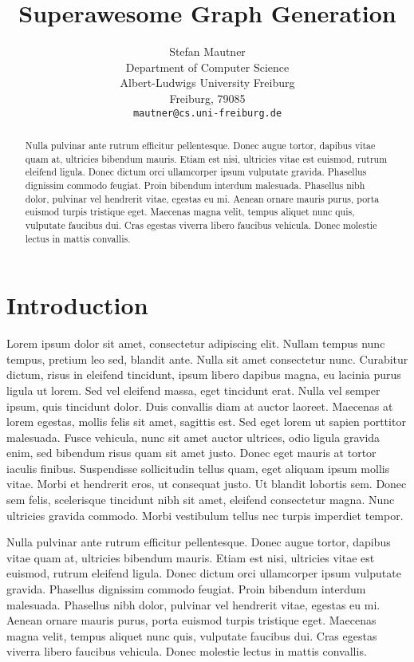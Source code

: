 \documentclass{article}
\title{Superawesome Graph Generation}
\author{
  Stefan Mautner\\
  Department of Computer Science\\
  Albert-Ludwigs University Freiburg\\
  Freiburg, 79085  \\
  \texttt{mautner@cs.uni-freiburg.de} \\
}
\begin{document}

\maketitle

\begin{abstract}
Nulla pulvinar ante rutrum efficitur pellentesque. Donec augue tortor, dapibus vitae quam at, ultricies bibendum mauris. Etiam est nisi, ultricies vitae est euismod, rutrum eleifend ligula. Donec dictum orci ullamcorper ipsum vulputate gravida. Phasellus dignissim commodo feugiat. Proin bibendum interdum malesuada. Phasellus nibh dolor, pulvinar vel hendrerit vitae, egestas eu mi. Aenean ornare mauris purus, porta euismod turpis tristique eget. Maecenas magna velit, tempus aliquet nunc quis, vulputate faucibus dui. Cras egestas viverra libero faucibus vehicula. Donec molestie lectus in mattis convallis.
\end{abstract}


\section{Introduction}

Lorem ipsum dolor sit amet, consectetur adipiscing elit. Nullam tempus nunc tempus, pretium leo sed, blandit ante. Nulla sit amet consectetur nunc. Curabitur dictum, risus in eleifend tincidunt, ipsum libero dapibus magna, eu lacinia purus ligula ut lorem. Sed vel eleifend massa, eget tincidunt erat. Nulla vel semper ipsum, quis tincidunt dolor. Duis convallis diam at auctor laoreet. Maecenas at lorem egestas, mollis felis sit amet, sagittis est. Sed eget lorem ut sapien porttitor malesuada. Fusce vehicula, nunc sit amet auctor ultrices, odio ligula gravida enim, sed bibendum risus quam sit amet justo. Donec eget mauris at tortor iaculis finibus. Suspendisse sollicitudin tellus quam, eget aliquam ipsum mollis vitae. Morbi et hendrerit eros, ut consequat justo. Ut blandit lobortis sem. Donec sem felis, scelerisque tincidunt nibh sit amet, eleifend consectetur magna. Nunc ultricies gravida commodo. Morbi vestibulum tellus nec turpis imperdiet tempor.

Nulla pulvinar ante rutrum efficitur pellentesque. Donec augue tortor, dapibus vitae quam at, ultricies bibendum mauris. Etiam est nisi, ultricies vitae est euismod, rutrum eleifend ligula. Donec dictum orci ullamcorper ipsum vulputate gravida. Phasellus dignissim commodo feugiat. Proin bibendum interdum malesuada. Phasellus nibh dolor, pulvinar vel hendrerit vitae, egestas eu mi. Aenean ornare mauris purus, porta euismod turpis tristique eget. Maecenas magna velit, tempus aliquet nunc quis, vulputate faucibus dui. Cras egestas viverra libero faucibus vehicula. Donec molestie lectus in mattis convallis.
\end{document}
